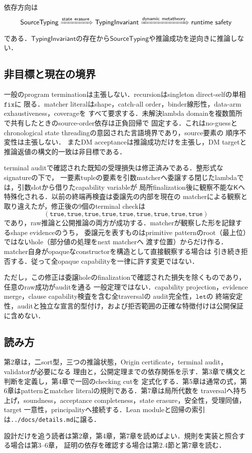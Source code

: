 依存方向は
\[
\mathsf{SourceTyping}
\xRightarrow{\mathsf{state\ erasure}}
\mathsf{TypingInvariant}
\xRightarrow{\mathsf{dynamic\ metatheory}}
\mathsf{runtime\ safety}
\]
である．$\mathsf{TypingInvariant}$の存在から$\mathsf{SourceTyping}$や推論成功を逆向きに推論しない．

\subsection{非目標と現在の境界}

一般のprogram terminationは主張しない．recursionはsingleton direct-selfの単相$\mathtt{fix}$に
限る．matcher literalはshape，catch-all order，binder線形性，data-arm exhaustiveness，coverageを
すべて要求する．未解決lambda domainを複数箇所で共有したときのsource-order依存は正負回帰で
固定する．これはno-guessとchronological state threadingの意図された言語境界であり，source要素の
順序不変性は主張しない．
またDM acceptanceは推論成功だけを主張し，DM targetと推論返値の構文的一致は非目標である．

terminal auditで確認された既知の受理損失は修正済みである．整形式なsignatureの下で，
一要素tupleの要素を引数matcherへ委譲する閉じたlambdaでは，引数slotから借りたcapability variableが
局所finalization後に観察不能な$\mathsf K$へ特殊化される．以前の終端再検査は委譲先の内部を現在の
matcherによる観察と取り違えたが，修正後の9個のterminal checkは
\[
(\mathtt{true},\mathtt{true},\mathtt{true},\mathtt{true},\mathtt{true},
 \mathtt{true},\mathtt{true},\mathtt{true},\mathtt{true})
\]
であり，raw推論と公開推論の両方が成功する．matcherが観察した形を記録するshape evidenceのうち，
委譲元を表すものはprimitive patternのroot（最上位）ではないhole（部分値の処理をnext matcherへ
渡す位置）からだけ作る．
matcher自身がopaqueなconstructorを構造として直接観察する場合は
引き続き拒否する．従って全opaque capabilityを一律に許す変更ではない．

ただし，この修正は委譲holeのfinalizationで確認された損失を除くものであり，任意のraw成功がauditを通る
一般定理ではない．capability projection，evidence merge，clause capability検査を含む全traversalの
audit完全性，$\mathtt{let}$の
終端安定性，auditと独立な宣言的型付け，および拒否範囲の正確な特徴付けは公開保証に含めない．

\subsection{読み方}

第2章は，二sort型，三つの推論状態，Origin certificate，terminal audit，validatorが必要になる
理由と，公開定理までの依存関係を示す．第3章で構文と判断を定義し，第4章で一回のchecking cutを
定式化する．第5章は通常の式，第6章はpatternとmatcher literalの規則である．第7章は局所代数を
traversalへ持ち上げ，soundness，acceptance completeness，state erasure，安全性，受理同値，target
一意性，principalityへ接続する．Lean moduleと回帰の索引は\texttt{../docs/details.md}に譲る．

設計だけを追う読者は第2章，第4章，第7章を読めばよい．規則を実装と照合する場合は第3--6章，
証明の依存を確認する場合は第2.4節と第7章を読む．
